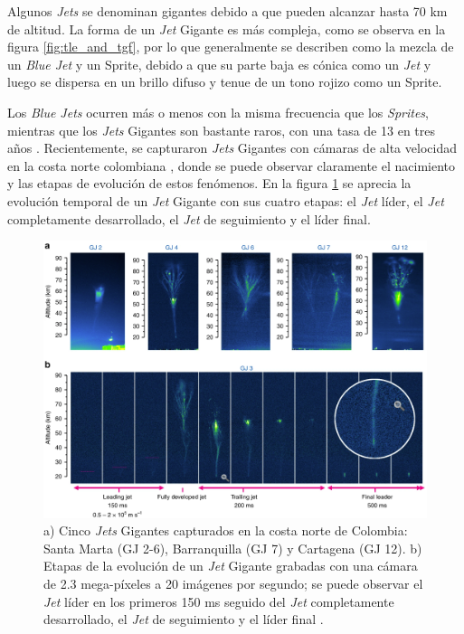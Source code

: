 \documentclass[11pt,oneside,openany,letter]{book}
\begin{document}
Algunos \textit{Jets} se denominan gigantes debido a que pueden alcanzar hasta 70 km de altitud. La forma de un \textit{Jet} Gigante es más compleja, como se observa en la figura \ref{fig:tle_and_tgf}, por lo que generalmente se describen como la mezcla de un \textit{Blue Jet} y un Sprite, debido a que su parte baja es cónica como un \textit{Jet} y luego se dispersa en un brillo difuso y tenue de un tono rojizo como un Sprite. 

Los \textit{Blue Jets} ocurren más o menos con la misma frecuencia que los \textit{Sprites}, mientras que los \textit{Jets} Gigantes son bastante raros, con una tasa de 13 en tres años \cite{chen2008}. Recientemente, se capturaron \textit{Jets} Gigantes con cámaras de alta velocidad en la costa norte colombiana \cite{VanEtal2019}, donde se puede observar claramente el nacimiento y las etapas de evolución de estos fenómenos. En la figura \ref{fig:gigantic_jets_colombia} se aprecia la evolución temporal de un \textit{Jet} Gigante con sus cuatro etapas: el \textit{Jet} líder, el \textit{Jet} completamente desarrollado, el \textit{Jet} de seguimiento y el líder final. 

\begin{figure}
    \centering
    \includegraphics[scale=0.45]{figures/gigantic_jets_colombia.png}
    \caption[\textit{Jets} Gigantes capturados en la costa norte de Colombia]{a) Cinco \textit{Jets} Gigantes capturados en la costa norte de Colombia: Santa Marta (GJ 2-6), Barranquilla (GJ 7) y Cartagena (GJ 12). b) Etapas de la evolución de un \textit{Jet} Gigante grabadas con una cámara de 2.3 mega-píxeles a 20 imágenes por segundo; se puede observar el \textit{Jet} líder en los primeros 150 ms seguido del \textit{Jet} completamente desarrollado, el \textit{Jet} de seguimiento y el líder final \cite{VanEtal2019}.}
    \label{fig:gigantic_jets_colombia}
\end{figure}
\end{document}
